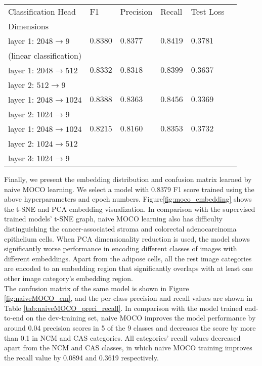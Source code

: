 \documentclass[12pt,twoside]{report}
\begin{document}
\begin{table}[]
    \centering
    \begin{tabular}{llllll}
    \toprule
    Classification Head & F1 & Precision & Recall & Test Loss \\
    Dimensions & & & & \\
    \midrule
    layer 1: $2048 \to 9$ & $0.8380$ & $0.8377$ & $0.8419$ & $0.3781$\\
    (linear classification)\\
    \midrule
    layer 1: $2048 \to 512$ & $0.8332$ & $0.8318$ & $0.8399$ & $0.3637$ \\
    layer 2: $512 \to 9$ \\
    \midrule
    layer 1: $2048 \to 1024$ & $0.8388$ & $0.8363$ & $0.8456$ & $0.3369$\\
    layer 2: $1024 \to 9$ \\
    \midrule
    layer 1: $2048 \to 1024$ & $0.8215$ & $0.8160$ & $0.8353$ & $0.3732$\\
    layer 2: $1024 \to 512$ \\
    layer 3: $1024 \to 9$ \\
    \bottomrule
    \end{tabular}
    \captionsetup{type=table}
    \label{tab:MOCO_multimlp}
\end{table}

Finally, we present the embedding distribution and confusion matrix learned by naive MOCO learning. We select a model with 0.8379 F1 score trained using the above hyperparameters and epoch numbers. Figure\ref{fig:moco_embedding} shows the t-SNE and PCA embedding visualization. In comparison with the supervised trained models' t-SNE graph, naive MOCO learning also has difficulty distinguishing the cancer-associated stroma and colorectal adenocarcinoma epithelium cells. When PCA dimensionality reduction is used, the model shows significantly worse performance in encoding different classes of images with different embeddings. Apart from the adipose cells, all the rest image categories are encoded to an embedding region that significantly overlaps with at least one other image category's embedding region. \\

The confusion matrix of the same model is shown in Figure \ref{fig:naiveMOCO_cm}, and the per-class precision and recall values are shown in Table \ref{tab:naiveMOCO_preci_recall}. In comparison with the model trained end-to-end on the dev-training set, naive MOCO improves the model performance by around 0.04 precision scores in 5 of the 9 classes and decreases the score by more than 0.1 in NCM and CAS categories. All categories' recall values decreased apart from the NCM and CAS classes, in which naive MOCO training improves the recall value by 0.0894 and 0.3619 respectively. 
\end{document}
